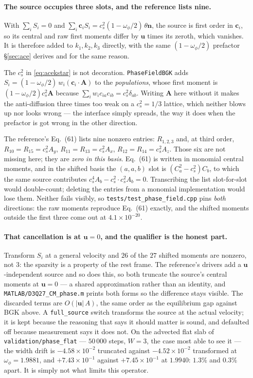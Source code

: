 \documentclass[11pt,a4paper]{article}
\newcommand{\code}[1]{\texttt{\small #1}}
\newcommand{\cs}{c_s}
\newcommand{\ci}{\bm{c}_i}
\newcommand{\uu}{\bm{u}}
\newcommand{\nn}{\bm{n}}
\newcommand{\e}[1]{\times 10^{#1}}
\begin{document}
\paragraph{The source occupies three slots, and the reference lists nine.} With
$\sum_i S_i = 0$ and $\sum_i \ci S_i = \cs^2(1-\omega_\phi/2)\,\theta\nn$, the
source is first order in $\ci$, so its central and raw first moments differ by
$\uu$ times its zeroth, which vanishes. It is therefore added to $k_1,k_2,k_3$
directly, with the same $(1-\omega_\phi/2)$ prefactor \S\ref{sec:ace} derives and
for the same reason.

The $\cs^2$ in \eqref{eq:acekstar} is not decoration. \code{PhaseFieldBGK} adds
$S_i = (1-\omega_\phi/2)\,w_i(\ci\!\cdot\!\bm{A})$ to the \emph{populations},
whose first moment is $(1-\omega_\phi/2)\cs^2\bm{A}$ because
$\sum_i w_i c_{ia}c_{ib} = \cs^2\delta_{ab}$. Writing $\bm{A}$ here without it
makes the anti-diffusion three times too weak on a $\cs^2=1/3$ lattice, which
neither blows up nor looks wrong --- the interface simply spreads, the way it does
when the prefactor is got wrong in the other direction.

The reference's Eq.~(61) lists nine nonzero entries: $R_{1,2,3}$ and, at third
order, $R_{10}=R_{15}=\cs^2A_y$, $R_{11}=R_{13}=\cs^2A_x$,
$R_{12}=R_{14}=\cs^2A_z$. Those six are not missing here; they are \emph{zero in
this basis}. Eq.~(61) is written in monomial central moments, and in the shifted
basis the $(a,a,b)$ slot is $(C_a^2-\cs^2)C_b$, to which the same source
contributes $\cs^4A_b - \cs^2\!\cdot\!\cs^2A_b = 0$. Transcribing the list
slot-for-slot would double-count; deleting the entries from a monomial
implementation would lose them. Neither fails visibly, so
\code{tests/test\_phase\_field.cpp} pins \emph{both} directions: the raw moments
reproduce Eq.~(61) exactly, and the shifted moments outside the first three come
out at $4.1\e{-20}$.

\paragraph{That cancellation is at $\uu=0$, and the qualifier is the honest part.}
Transform $S_i$ at a general velocity and $26$ of the $27$ shifted moments are
nonzero, not $3$: the sparsity is a property of the rest frame. The reference's
drivers add a $\uu$-independent source and so does this, so both truncate the
source's central moments at $\uu=0$ --- a shared approximation rather than an
identity, and \code{MATLAB/D3Q27\_CM\_phase.m} prints both forms so the difference
stays visible. The discarded terms are $O(|\uu|\,A)$, the same order as the
equilibrium gap against BGK above. A \code{full\_source} switch transforms the
source at the actual velocity; it is kept because the reasoning that says it
should matter is sound, and defaulted off because measurement says it does not.
On the advected flat slab of \code{validation/phase\_flat} --- $50\,000$ steps,
$W=3$, the case most able to see it --- the width drift is $-4.58\e{-2}$
truncated against $-4.52\e{-2}$ transformed at $\omega_\phi = 1.9881$, and
$+7.43\e{-1}$ against $+7.45\e{-1}$ at $1.9940$: $1.3\%$ and $0.3\%$ apart. It is
simply not what limits this operator.
\end{document}
